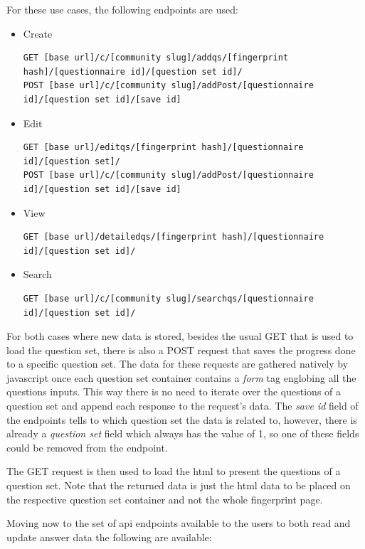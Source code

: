 For these use cases, the following endpoints are used:

\begin{itemize}
    \item Create
\begin{lstlisting}[basicstyle=\tiny]
GET [base url]/c/[community slug]/addqs/[fingerprint hash]/[questionnaire id]/[question set id]/
POST [base url]/c/[community slug]/addPost/[questionnaire id]/[question set id]/[save id]
\end{lstlisting}
    \item Edit
\begin{lstlisting}[basicstyle=\tiny]
GET [base url]/editqs/[fingerprint hash]/[questionnaire id]/[question set]/
POST [base url]/c/[community slug]/addPost/[questionnaire id]/[question set id]/[save id]
\end{lstlisting}
    \item View
\begin{lstlisting}[basicstyle=\tiny]
GET [base url]/detailedqs/[fingerprint hash]/[questionnaire id]/[question set id]/
\end{lstlisting}
    \item Search
\begin{lstlisting}[basicstyle=\tiny]
GET [base url]/c/[community slug]/searchqs/[questionnaire id]/[question set id]/
\end{lstlisting}
\end{itemize}

For both cases where new data is stored, besides the usual GET that is used to load the question set, there is also a POST request that saves the progress done to a specific question set.
The data for these requests are gathered natively by javascript once each question set container contains a \textit{form} tag englobing all the questions inputs.
This way there is no need to iterate over the questions of a question set and append each response to the request's data.
The \textit{save id} field of the endpoints tells to which question set the data is related to, however, there is already a \textit{question set} field which always has the value of 1, so one of these fields could be removed from the endpoint.

The GET request is then used to load the \gls{html} to present the questions of a question set.
Note that the returned data is just the \gls{html} data to be placed on the respective question set container and not the whole fingerprint page.

Moving now to the set of \gls{api} endpoints available to the users to both read and update answer data the following are available:

